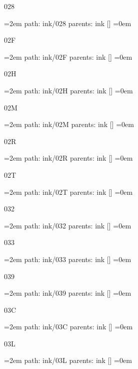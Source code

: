 \bigskip
{}
028
\smallskip
\par\begingroup
\leftskip=2em
path: ink/028
\smallskip
parents:  ink []
\smallskip
\leftskip=0em
\par\endgroup
\bigskip
{}
02F
\smallskip
\par\begingroup
\leftskip=2em
path: ink/02F
\smallskip
parents:  ink []
\smallskip
\leftskip=0em
\par\endgroup
\bigskip
{}
02H
\smallskip
\par\begingroup
\leftskip=2em
path: ink/02H
\smallskip
parents:  ink []
\smallskip
\leftskip=0em
\par\endgroup
\bigskip
{}
02M
\smallskip
\par\begingroup
\leftskip=2em
path: ink/02M
\smallskip
parents:  ink []
\smallskip
\leftskip=0em
\par\endgroup
\bigskip
{}
02R
\smallskip
\par\begingroup
\leftskip=2em
path: ink/02R
\smallskip
parents:  ink []
\smallskip
\leftskip=0em
\par\endgroup
\bigskip
{}
02T
\smallskip
\par\begingroup
\leftskip=2em
path: ink/02T
\smallskip
parents:  ink []
\smallskip
\leftskip=0em
\par\endgroup
\bigskip
{}
032
\smallskip
\par\begingroup
\leftskip=2em
path: ink/032
\smallskip
parents:  ink []
\smallskip
\leftskip=0em
\par\endgroup
\bigskip
{}
033
\smallskip
\par\begingroup
\leftskip=2em
path: ink/033
\smallskip
parents:  ink []
\smallskip
\leftskip=0em
\par\endgroup
\bigskip
{}
039
\smallskip
\par\begingroup
\leftskip=2em
path: ink/039
\smallskip
parents:  ink []
\smallskip
\leftskip=0em
\par\endgroup
\bigskip
{}
03C
\smallskip
\par\begingroup
\leftskip=2em
path: ink/03C
\smallskip
parents:  ink []
\smallskip
\leftskip=0em
\par\endgroup
\bigskip
{}
03L
\smallskip
\par\begingroup
\leftskip=2em
path: ink/03L
\smallskip
parents:  ink []
\smallskip
\leftskip=0em
\par\endgroup
